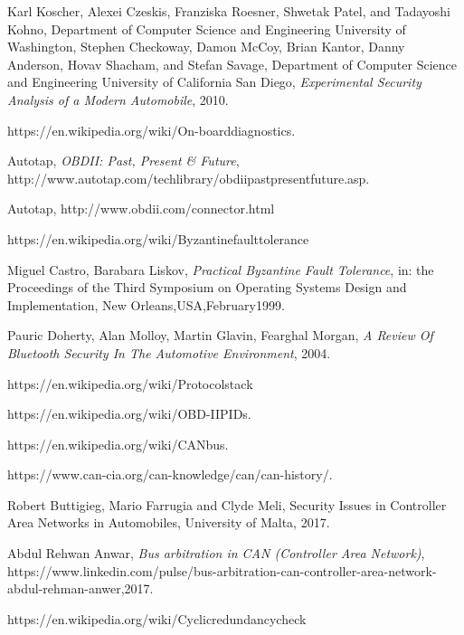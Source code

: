 \documentclass[11pt]{article}
\begin{document}
\begin{thebibliography}{10}
	Karl Koscher, Alexei Czeskis, Franziska Roesner, Shwetak Patel, and Tadayoshi Kohno,
	Department of Computer Science and Engineering University of Washington, Stephen Checkoway, Damon McCoy, Brian Kantor, Danny Anderson, Hovav Shacham, and Stefan Savage, Department of Computer Science and Engineering University of California San Diego, \textit{Experimental Security Analysis of a Modern Automobile}, 2010.
	
	https://en.wikipedia.org/wiki/On-board\textunderscore diagnostics.
	
	Autotap, \textit{OBDII: Past, Present \& Future},
	http://www.autotap.com/techlibrary/obdii\textunderscore past\textunderscore present\textunderscore future.asp.
	
	Autotap, http://www.obdii.com/connector.html
	
	https://en.wikipedia.org/wiki/Byzantine\textunderscore fault\textunderscore tolerance
	
	Miguel Castro, Barabara Liskov, \textit{Practical Byzantine Fault Tolerance}, in: the Proceedings of the Third Symposium on Operating Systems Design and Implementation, New Orleans,USA,February1999.
	
	Pauric Doherty, Alan Molloy, Martin Glavin, Fearghal Morgan,
	\textit{A Review Of Bluetooth Security In The Automotive Environment}, 2004.
	
	https://en.wikipedia.org/wiki/Protocol\textunderscore stack
	
	https://en.wikipedia.org/wiki/OBD-II\textunderscore PIDs.
	
	https://en.wikipedia.org/wiki/CAN\textunderscore bus.
	
	https://www.can-cia.org/can-knowledge/can/can-history/.
	
	Robert Buttigieg, Mario Farrugia and Clyde Meli, Security Issues in Controller Area Networks in Automobiles, University of Malta, 2017.
	
	Abdul Rehwan Anwar, \textit{Bus arbitration in CAN (Controller Area Network)}, https://www.linkedin.com/pulse/bus-arbitration-can-controller-area-network-abdul-rehman-anwer,2017.
	
	https://en.wikipedia.org/wiki/Cyclic\textunderscore redundancy\textunderscore check
	

\end{thebibliography}
\end{document}
